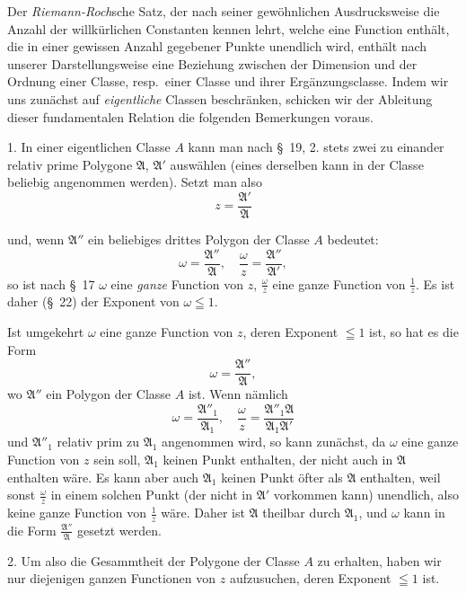 \documentclass{article}
\begin{document}
Der \emph{Riemann-Roch}sche Satz, der nach seiner gewöhnlichen Ausdrucksweise die Anzahl der willkürlichen Constanten kennen lehrt, welche eine Function enthält, die in einer gewissen Anzahl gegebener Punkte unendlich wird, enthält nach unserer Darstellungsweise eine Beziehung zwischen der Dimension und der Ordnung einer Classe, resp.\ einer Classe und ihrer Ergänzungsclasse. Indem wir uns zunächst auf \emph{eigentliche} Classen beschränken, schicken wir der Ableitung dieser fundamentalen Relation die folgenden Bemerkungen voraus.

1. In einer eigentlichen Classe $A$ kann man nach §~19, 2. stets zwei zu einander relativ prime Polygone $\mathfrak{A}$, $\mathfrak{A}'$ auswählen (eines derselben kann in der Classe beliebig angenommen werden). Setzt man also
\[ z = \frac{\mathfrak{A}'}{\mathfrak{A}} \]

und, wenn $\mathfrak{A}''$ ein beliebiges drittes Polygon der Classe $A$ bedeutet:
\[ \omega = \frac{\mathfrak{A}''}{\mathfrak{A}}, \quad \frac{\omega}{z} = \frac{\mathfrak{A}''}{\mathfrak{A}'}, \]
so ist nach §~17 $\omega$ eine \emph{ganze} Function von $z$, $\frac{\omega}{z}$ eine ganze Function von $\frac{1}{z}$. Es ist daher (§~22) der Exponent von $\omega \leqq 1$.

Ist umgekehrt $\omega$ eine ganze Function von $z$, deren Exponent $\leqq 1$ ist, so hat es die Form
\[ \omega = \frac{\mathfrak{A}''}{\mathfrak{A}}, \]
wo $\mathfrak{A}''$ ein Polygon der Classe $A$ ist. Wenn nämlich
\[ \omega = \frac{\mathfrak{A}''_{1}}{\mathfrak{A}_{1}}, \quad \frac{\omega}{z} = \frac{\mathfrak{A}''_{1}\mathfrak{A}}{\mathfrak{A}_{1}\mathfrak{A}'} \]
und $\mathfrak{A}''_{1}$ relativ prim zu $\mathfrak{A}_{1}$ angenommen wird, so kann zunächst, da $\omega$ eine ganze Function von $z$ sein soll, $\mathfrak{A}_{1}$ keinen Punkt enthalten, der nicht auch in $\mathfrak{A}$ enthalten wäre. Es kann aber auch $\mathfrak{A}_{1}$ keinen Punkt öfter als $\mathfrak{A}$ enthalten, weil sonst $\frac{\omega}{z}$ in einem solchen Punkt (der nicht in $\mathfrak{A}'$ vorkommen kann) unendlich, also keine ganze Function von $\frac{1}{z}$ wäre. Daher ist $\mathfrak{A}$ theilbar durch $\mathfrak{A}_{1}$, und $\omega$ kann in die Form $\frac{\mathfrak{A}''}{\mathfrak{A}}$ gesetzt werden.

2. Um also die Gesammtheit der Polygone der Classe $A$ zu erhalten, haben wir nur diejenigen ganzen Functionen von $z$ aufzusuchen, deren Exponent $\leqq 1$ ist.
\end{document}
